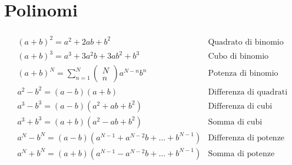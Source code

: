 \documentclass[letterpaper,10pt,italian]{jupyterBook}
\begin{document}
\section{Polinomi}
\label{\detokenize{ch/algebra/real-algebra:polinomi}}
\sphinxAtStartPar
{}
\begin{equation*}
\begin{split}\begin{aligned}
 & (a+b)^2 = a^2 + 2ab + b^2                           & \text{Quadrato di binomio} \\
 & (a+b)^3 = a^3 + 3a^2 b + 3 a b^2 + b^3              & \text{Cubo di binomio} \\
 & (a+b)^N = \sum_{n=1}^{N} \left( \begin{matrix} N \\ n \end{matrix} \right) a^{N-n} b^n
 & \text{Potenza di binomio} \\
 & a^2 - b^2 = (a-b)(a+b)                              & \text{Differenza di quadrati} \\
 & a^3 - b^3 = (a-b)(a^2+ab+b^2)                       & \text{Differenza di cubi} \\
 & a^3 + b^3 = (a+b)(a^2-ab+b^2)                       & \text{Somma di cubi} \\
 & a^N - b^N = (a-b)(a^{N-1}+a^{N-2}b+\dots+b^{N-1})   & \text{Differenza di potenze} \\
 & a^N + b^N = (a+b)(a^{N-1}-a^{N-2}b+\dots+b^{N-1})   & \text{Somma di potenze dispari} \\
\end{aligned}\end{split}
\end{equation*}
\sphinxAtStartPar
{} 
\end{document}

